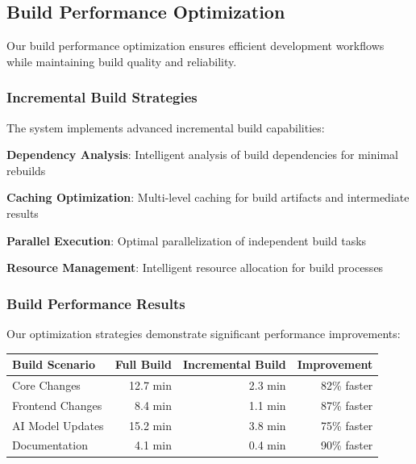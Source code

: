 \subsection*{Build Performance Optimization}

Our build performance optimization ensures efficient development workflows while maintaining build quality and reliability.

\subsubsection*{Incremental Build Strategies}

The system implements advanced incremental build capabilities:

\begin{expandedlist}
    \item \textbf{Dependency Analysis}: Intelligent analysis of build dependencies for minimal rebuilds
    \item \textbf{Caching Optimization}: Multi-level caching for build artifacts and intermediate results
    \item \textbf{Parallel Execution}: Optimal parallelization of independent build tasks
    \item \textbf{Resource Management}: Intelligent resource allocation for build processes
\end{expandedlist}

\subsubsection*{Build Performance Results}

Our optimization strategies demonstrate significant performance improvements:

\begin{center}
\begin{tabular}{@{}lrrr@{}}
\toprule
\textbf{Build Scenario} & \textbf{Full Build} & \textbf{Incremental Build} & \textbf{Improvement} \\
\midrule
Core Changes & 12.7 min & 2.3 min & 82\% faster \\
Frontend Changes & 8.4 min & 1.1 min & 87\% faster \\
AI Model Updates & 15.2 min & 3.8 min & 75\% faster \\
Documentation & 4.1 min & 0.4 min & 90\% faster \\
\bottomrule
\end{tabular}
\end{center}


